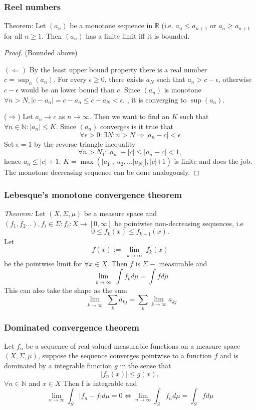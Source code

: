 \documentclass[titlepage]{article}
\begin{document}
\subsubsection{Reel numbers}
Theorem: Let $(a_n)$ be a monotone sequence in $\mathbb{R}$ (i.e. $a_n \leq a_{n+1}$ or $a_n \geq a_{n+1}$ for all $n\geq1$. Then $(a_n)$ has a finite limit iff it is bounded.
\begin{proof}
(Bounded above)

$(\Leftarrow)$
By the least upper bound property there is a real number $c = \sup_n (a_n)$. For every $\epsilon \geq 0$, there exists $a_N$ such that $a_n > c-\epsilon$, otherwise $c-\epsilon$ would be an lower bound than $c$. Since $(a_n)$ is monotone $\forall n>N, |c-a_n| = c-a_n \leq c-a_N < \epsilon.$ , it is converging to $\sup(a_n)$.

($\Rightarrow$) Let $a_n \rightarrow c$ as $n\rightarrow \infty$. Then we want to find an $K$ such that $\forall n \in \mathbb{N}: |a_n|\leq K$. Since $(a_n)$ converges is it true that $$\forall \epsilon >0: \exists N: n>N \Longrightarrow |a_n - c| < \epsilon$$
Set  $\epsilon = 1$ by the reverse triangle inequality
$$\forall n >N_1 : |a_n| - |c| \leq |a_n - c| < 1,$$
hence $a_n \leq |c| + 1$.
$K = \max \left(|a_1|, |a_2, ...|a_{N_1}|, |c|+1\right)$ is finite and does the job. The monotone decreasing sequence can be done analogously.
\end{proof}
\subsubsection{Lebesque's monotone convergence theorem}
\textit{Theorem:} Let $(X,\Sigma, \mu)$ be a measure space and $(f_1,f_2...), f_i \in \Sigma : f_i: X \rightarrow [0,\infty]$ be pointwise non-decreasing sequences, i.e
$$ 0 \leq f_k(x) \leq f_{k+1}(x).$$
Let
$$f(x) := \lim\limits_{\substack{k\rightarrow \infty}} f_k(x)$$
be the pointwise limit for $\forall x \in X.$
Then $f$ is $\Sigma-$ measurable and 
\begin{equation}
\lim\limits_{\substack{k\rightarrow \infty}}\int f_k d\mu = \int f d\mu 
\end{equation}
This can also take the shape as the sum
\begin{equation}
\lim\limits_{\substack{k\rightarrow \infty}}\sum_k a_{kj} = \sum_k \lim_{k\rightarrow \infty} a_{kj}
\end{equation}
\subsubsection{Dominated convergence theorem}
 Let $f_n$ be a sequence of real-valued measurable functions on a measure space $(X,\Sigma, \mu)$, suppose the sequence converges pointwise to a function $f$ and is dominated by a integrable function $g$ in the sense that
 \begin{equation}
 |f_n(x)| \leq g(x),
 \end{equation}
 $\forall n\in \mathbb{N}$ and $x\in X$
 Then f is integrable and 
 \begin{equation}
 \lim_{n\rightarrow \infty} \int_S |f_n - f|d\mu = 0 \Longleftrightarrow
 \lim_{n\rightarrow \infty} \int_S f_n d\mu = \int_S f d\mu 
 \end{equation}
 
\end{document}
